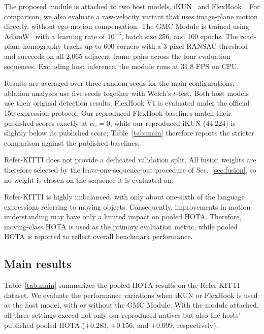 \documentclass{article}
\begin{document}
The proposed module is attached to two host models, iKUN~\cite{ikun} and FlexHook~\cite{flexhook}. For comparison, we also evaluate a raw-velocity variant that uses image-plane motion directly, without ego-motion compensation. The GMC Module is trained using AdamW~\cite{adamw} with a learning rate of $10^{-3}$, batch size 256, and 100 epochs. The road-plane homography tracks up to 600 corners with a 3-pixel RANSAC threshold and succeeds on all 2,065 adjacent frame pairs across the four evaluation sequences. Excluding host inference, the module runs at $31.8$ FPS on CPU.

Results are averaged over three random seeds for the main configurations; ablation analyses use five seeds together with Welch's $t$-test. Both host models use their original detection results; FlexHook V1 is evaluated under the official 150-expression protocol. Our reproduced FlexHook baselines match their published scores exactly at $\alpha_c{=}0$, while our reproduced iKUN ($44.224$) is slightly below its published score; Table~\ref{tab:main} therefore reports the stricter comparison against the published baselines.

Refer-KITTI does not provide a dedicated validation split. All fusion weights are therefore selected by the leave-one-sequence-out procedure of Sec.~\ref{sec:fusion}, so no weight is chosen on the sequence it is evaluated on.

Refer-KITTI is highly imbalanced, with only about one-sixth of the language expressions referring to moving objects. Consequently, improvements in motion understanding may have only a limited impact on pooled HOTA. Therefore, moving-class HOTA is used as the primary evaluation metric, while pooled HOTA is reported to reflect overall benchmark performance.

\subsection{Main results}
\label{sec:main}
Table~\ref{tab:main} summarizes the pooled HOTA results on the Refer-KITTI dataset. We evaluate the performance variations when iKUN or FlexHook is used as the host model, with or without the GMC Module. With the module attached, all three settings exceed not only our reproduced natives but also the hosts' published pooled HOTA ($+0.283$, $+0.156$, and $+0.099$, respectively).

\end{document}
